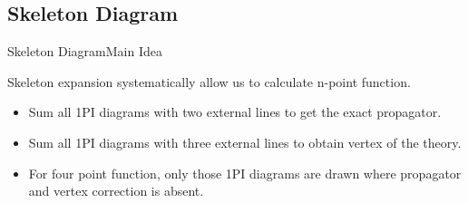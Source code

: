\documentclass[pdf]{beamer}
\begin{document}
            \subsection{Skeleton Diagram}

                \begin{frame}[t]{Skeleton Diagram}{Main Idea}

                        Skeleton expansion systematically allow us to calculate n-point function.

                    \begin{itemize}
                        \item<2-> Sum all 1PI diagrams with two external lines to get the exact propagator.
                        \item <3-> Sum all 1PI diagrams with three external lines to obtain vertex of the theory.
                        \item <4-> For four point function, only those 1PI diagrams are drawn where propagator and vertex correction is absent.
                    \end{itemize}

                \end{frame}
\end{document}
